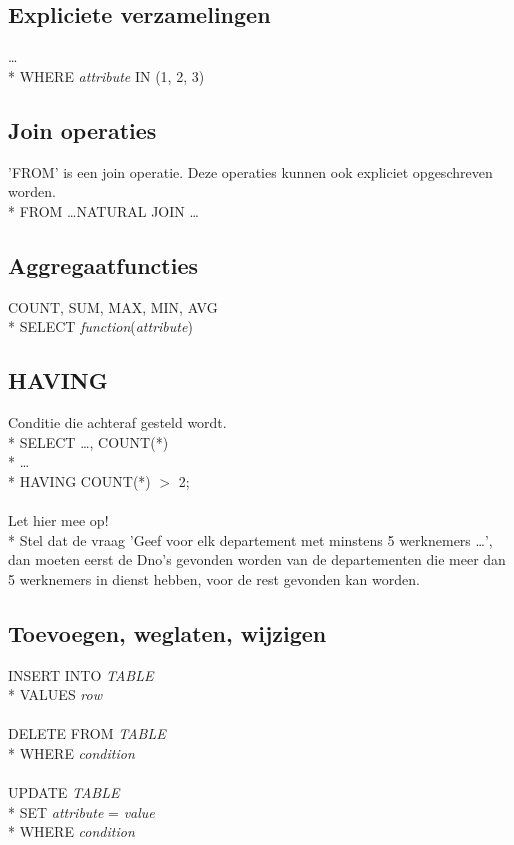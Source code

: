 \documentclass[10pt]{article}
\begin{document}
\subsection{Expliciete verzamelingen}
\dots\\*
WHERE \textit{attribute} IN (1, 2, 3)
\subsection{Join operaties}
'FROM' is een join operatie. Deze operaties kunnen ook expliciet opgeschreven worden.\\*
FROM \dots NATURAL JOIN \dots
\subsection{Aggregaatfuncties}
COUNT, SUM, MAX, MIN, AVG\\*
SELECT \textit{function}(\textit{attribute})
\subsection{HAVING}
Conditie die achteraf gesteld wordt.\\*
SELECT \dots, COUNT(*)\\*
\dots\\*
HAVING COUNT(*) $>$ 2;\\\\
Let hier mee op!\\*
Stel dat de vraag 'Geef voor elk departement met minstens 5 werknemers \dots', dan moeten eerst de Dno's gevonden worden van de departementen die meer dan 5 werknemers in dienst hebben, voor de rest gevonden kan worden.
\subsection{Toevoegen, weglaten, wijzigen}
INSERT INTO \textit{TABLE}\\*
VALUES \textit{row}\\\\
DELETE FROM \textit{TABLE}\\*
WHERE \textit{condition}\\\\
UPDATE \textit{TABLE}\\*
SET \textit{attribute} = \textit{value}\\*
WHERE \textit{condition}
\end{document}
